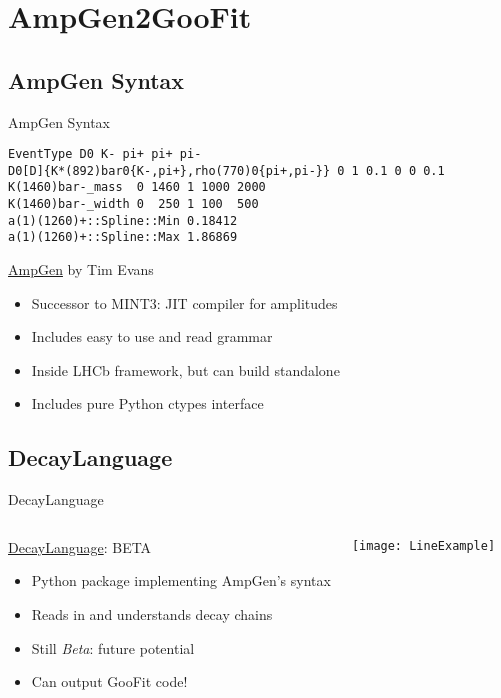 \documentclass[aspectratio=169, smaller]{beamer}
\begin{document}
\section{AmpGen2GooFit}
\subsection{AmpGen Syntax}
\begin{frame}[fragile]{AmpGen Syntax}
    \begin{lstlisting}
EventType D0 K- pi+ pi+ pi-
D0[D]{K*(892)bar0{K-,pi+},rho(770)0{pi+,pi-}} 0 1 0.1 0 0 0.1
K(1460)bar-_mass  0 1460 1 1000 2000
K(1460)bar-_width 0  250 1 100  500
a(1)(1260)+::Spline::Min 0.18412
a(1)(1260)+::Spline::Max 1.86869
    \end{lstlisting}
    
    \begin{block}{\href{https://gitlab.cern.ch/lhcb/Gauss/tree/LHCBGAUSS-1058.AmpGenDev/Gen/AmpGen}{AmpGen} by Tim Evans}
    \begin{itemize}
        \item Successor to MINT3: JIT compiler for amplitudes
        \item Includes easy to use and read grammar
        \item Inside LHCb framework, but can build standalone 
        \item Includes pure Python ctypes interface
    \end{itemize}
\end{block}
\end{frame}

\subsection{DecayLanguage}
\begin{frame}{DecayLanguage}
    \begin{columns}[c]
        \begin{block}{\href{https://decaylanguage.readthedocs.io/en/latest/}{DecayLanguage}: BETA}
            \begin{itemize}
                \item Python package implementing AmpGen's syntax
                \item Reads in and understands decay chains
                \item Still \emph{Beta}: future potential
                \item Can output GooFit code!
            \end{itemize}
        \end{block}
        \texttt{[image: LineExample]}
    \end{columns}
\end{frame}
\end{document}
